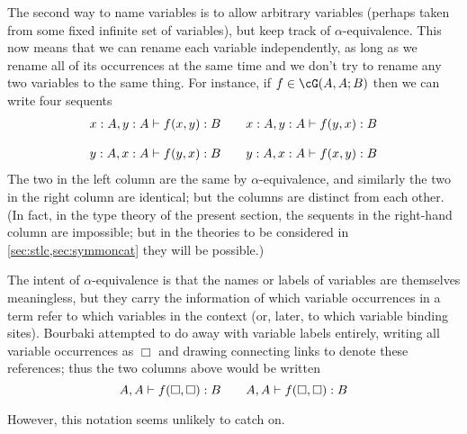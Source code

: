 The second way to name variables is to allow arbitrary variables (perhaps taken from some fixed infinite set of variables), but keep track of $\alpha$-equivalence.
This now means that we can rename each variable independently, as long as we rename all of its occurrences at the same time and we don't try to rename any two variables to the same thing.
For instance, if $f\in\cG(A,A;B)$ then we can write four sequents
\[
\begin{array}{c@{\qquad}c}
  x:A, y:A \types f(x,y):B &
  x:A, y:A \types f(y,x):B \\\\
  y:A, x:A \types f(y,x):B &
  y:A, x:A \types f(x,y):B
\end{array}
\]
The two in the left column are the same by $\alpha$-equivalence, and similarly the two in the right column are identical; but the columns are distinct from each other.
(In fact, in the type theory of the present section, the sequents in the right-hand column are impossible; but in the theories to be considered in \cref{sec:stlc,sec:symmoncat} they will be possible.)

\begin{rmk}
The intent of $\alpha$-equivalence is that the names or labels of variables are themselves meaningless, but they carry the information of which variable occurrences in a term refer to which variables in the context (or, later, to which variable binding sites).
Bourbaki attempted to do away with variable labels entirely, writing all variable occurrences as $\Box$ and drawing connecting links to denote these references; thus the two columns above would be written
\[
\tikz[remember picture] \node[rectangle, inner sep=0pt] (a1) {$A$};,
\tikz[remember picture] \node[rectangle, inner sep=0pt] (a2) {$A$}; \types
f(\tikz[remember picture] \node[rectangle, inner sep=0pt] (b1) {$\Box$};,
\tikz[remember picture] \node[rectangle, inner sep=0pt] (b2) {$\Box$};) : B
\qquad
\tikz[remember picture] \node[rectangle, inner sep=0pt] (a1p) {$A$};,
\tikz[remember picture] \node[rectangle, inner sep=0pt] (a2p) {$A$}; \types
f(\tikz[remember picture] \node[rectangle, inner sep=0pt] (b2p) {$\Box$};,
\tikz[remember picture] \node[rectangle, inner sep=0pt] (b1p) {$\Box$};) : B
\]

\noindent
However, this notation seems unlikely to catch on.
\end{rmk}

